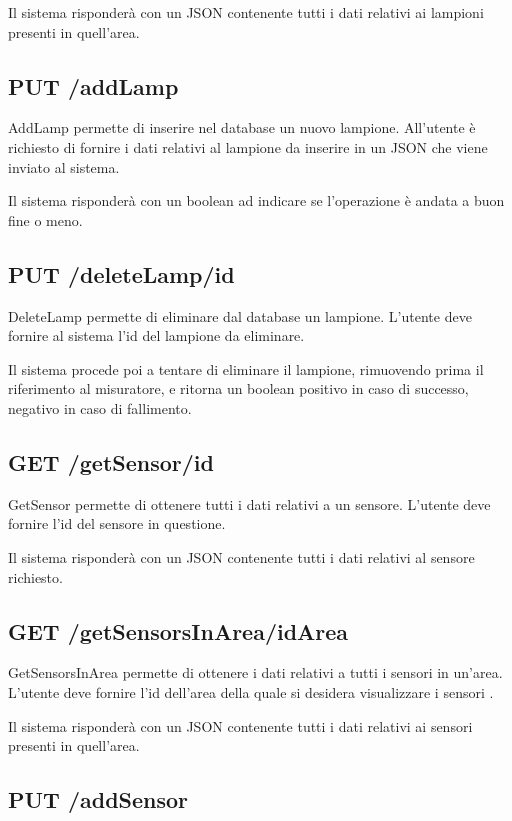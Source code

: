 Il sistema risponderà con un JSON contenente tutti i dati relativi ai lampioni presenti in quell'area.

\subsection{ PUT /addLamp}

AddLamp permette di inserire nel database un nuovo lampione. All'utente è richiesto di fornire i dati relativi al lampione da inserire in un JSON che viene inviato al sistema.

Il sistema risponderà con un boolean ad indicare se l'operazione è andata a buon fine o meno.

\subsection{ PUT /deleteLamp/id}

DeleteLamp permette di eliminare dal database un lampione. L'utente deve fornire al sistema l'id del lampione da eliminare.

Il sistema procede poi a tentare di eliminare il lampione, rimuovendo prima il riferimento al misuratore, e ritorna un boolean positivo in caso di successo, negativo in caso di fallimento.

\subsection{ GET /getSensor/id}

GetSensor permette di ottenere tutti i dati relativi a un sensore. L'utente deve fornire l'id del sensore in questione.

Il sistema risponderà con un JSON contenente tutti i dati relativi al sensore richiesto.

\subsection{ GET /getSensorsInArea/idArea}

GetSensorsInArea permette di ottenere i dati relativi a tutti i sensori in un'area. L'utente deve fornire l'id dell'area della quale si desidera visualizzare i sensori .

Il sistema risponderà con un JSON contenente tutti i dati relativi ai sensori presenti in quell'area.

\subsection{ PUT /addSensor}

